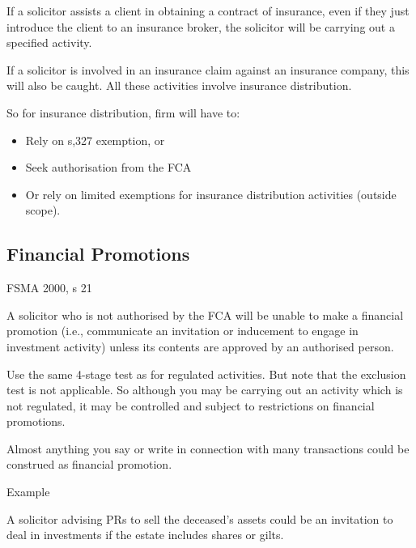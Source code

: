 \documentclass[
]{article}
\providecommand{\tightlist}{%
  \setlength{\itemsep}{0pt}\setlength{\parskip}{0pt}}
\newenvironment{env-28b706cc-8a08-422f-af86-ede86c79505b}
{
    \savenotes\tcolorbox[blanker,breakable,left=5pt,borderline west={2pt}{-4pt}{green}]
}
{
    \endtcolorbox\spewnotes
}
\newenvironment{env-4f1f1fac-cb83-4fe6-a11e-b3a07eb0c3eb}
{
    \savenotes\tcolorbox[blanker,breakable,left=5pt,borderline west={2pt}{-4pt}{purple}]
}
{
    \endtcolorbox\spewnotes
}
\begin{document}
If a solicitor assists a client in obtaining a contract of insurance,
even if they just introduce the client to an insurance broker, the
solicitor will be carrying out a specified activity.

If a solicitor is involved in an insurance claim against an insurance
company, this will also be caught. All these activities involve
insurance distribution.

So for insurance distribution, firm will have to:

\begin{itemize}
\tightlist
\item
  Rely on s,327 exemption, or
\item
  Seek authorisation from the FCA
\item
  Or rely on limited exemptions for insurance distribution activities
  (outside scope).
\end{itemize}

\hypertarget{financial-promotions}{%
\subsection{Financial Promotions}\label{financial-promotions}}

\begin{env-28b706cc-8a08-422f-af86-ede86c79505b}

FSMA 2000, s 21

A solicitor who is not authorised by the FCA will be unable to make a
financial promotion (i.e., communicate an invitation or inducement to
engage in investment activity) unless its contents are approved by an
authorised person.

\end{env-28b706cc-8a08-422f-af86-ede86c79505b}

Use the same 4-stage test as for regulated activities. But note that the
exclusion test is not applicable. So although you may be carrying out an
activity which is not regulated, it may be controlled and subject to
restrictions on financial promotions.

Almost anything you say or write in connection with many transactions
could be construed as financial promotion.

\begin{env-4f1f1fac-cb83-4fe6-a11e-b3a07eb0c3eb}

Example

A solicitor advising PRs to sell the deceased's assets could be an
invitation to deal in investments if the estate includes shares or
gilts.

\end{env-4f1f1fac-cb83-4fe6-a11e-b3a07eb0c3eb}
\end{document}
